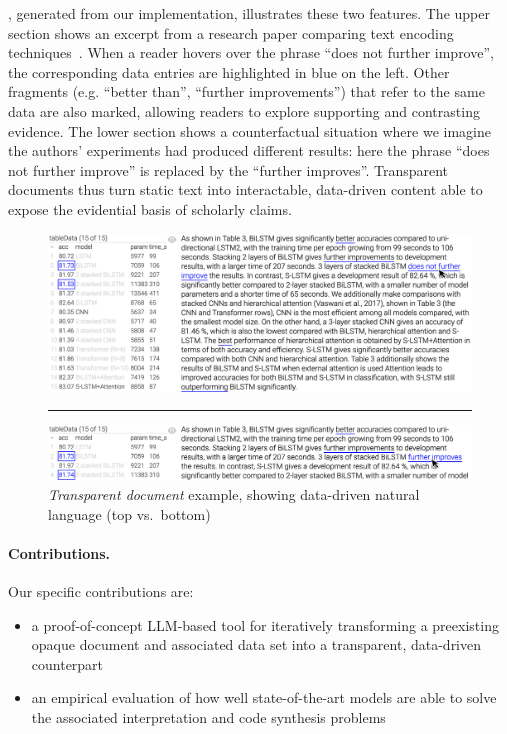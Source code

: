 , generated from our implementation, illustrates these two features. The upper
section shows an excerpt from a research paper comparing text encoding techniques~\citep{zhang18}. When a
reader hovers over the phrase ``does not further improve'', the corresponding data entries are highlighted in
blue on the left. Other fragments (e.g. ``better than'', ``further improvements'') that refer to the same data
are also marked, allowing readers to explore supporting and contrasting evidence. The lower section shows a
counterfactual situation where we imagine the authors' experiments had produced different results: here the
phrase ``does not further improve'' is replaced by the ``further improves''. Transparent documents thus turn
static text into interactable, data-driven content able to expose the evidential basis of scholarly claims.

\begin{figure}%
    \centering
    \includegraphics[width=\linewidth]{fig/scigen-1805.02474v1-10-with-pointer.png}
    \vspace{1mm}
    \hrule
    \includegraphics[width=\linewidth]{fig/scigen-1805.02474v1-10-counterfactual-with-pointer.png}
    \caption{\emph{Transparent document} example, showing data-driven natural language (top
    vs.~bottom)}
    \label{fig:scigen-example-website}
\end{figure}

\paragraph{Contributions.} Our specific contributions are:

\begin{itemize}
\item a proof-of-concept LLM-based tool for iteratively transforming a preexisting opaque document and
associated data set into a transparent, data-driven counterpart
\item an empirical evaluation of how well state-of-the-art models are able to solve the associated
interpretation and code synthesis problems
\end{itemize}


